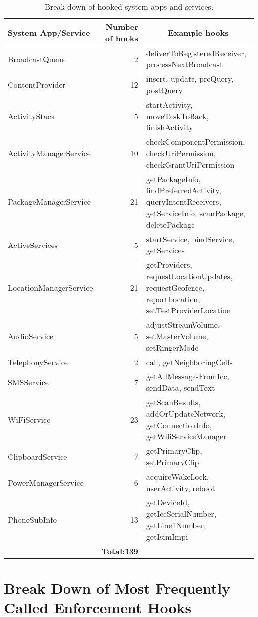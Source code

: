 \documentclass[letterpaper,twocolumn,10pt]{article}
\begin{document}
\begin{table}[h]
  \centering
  \small
  \begin{tabular}{|l|r|p{8cm}|}\hline
    \textbf{System App/Service} & \textbf{Number of hooks} & \multicolumn{1}{|c|}{\textbf{Example hooks}}\\\hline\hline
    BroadcastQueue & 2 & deliverToRegisteredReceiver, processNextBroadcast \\\hline
    ContentProvider & 12 & insert, update, preQuery, postQuery \\\hline
    ActivityStack & 5 & startActivity, moveTaskToBack, finishActivity \\\hline
    ActivityManagerService & 10 & checkComponentPermission, checkUriPermission, checkGrantUriPermission\\\hline
    PackageManagerService & 21 & getPackageInfo, findPreferredActivity, queryIntentReceivers, getServiceInfo, scanPackage, deletePackage\\\hline
ActiveServices & 5 & startService, bindService, getServices\\\hline
LocationManagerService & 21 & getProviders, requestLocationUpdates, requestGeofence, reportLocation, setTestProviderLocation\\\hline
AudioService & 5 & adjustStreamVolume, setMasterVolume, setRingerMode\\\hline
TelephonyService & 2 & call, getNeighboringCells\\\hline
SMSService & 7 & getAllMessagesFromIcc, sendData, sendText\\\hline
WiFiService & 23 & getScanResults, addOrUpdateNetwork, getConnectionInfo, getWifiServiceManager\\\hline
ClipboardService & 7 & getPrimaryClip, setPrimaryClip\\\hline
PowerManagerService & 6 & acquireWakeLock, userActivity, reboot\\\hline
PhoneSubInfo & 13 & getDeviceId, getIccSerialNumber, getLine1Number, getIsimImpi\\\hline
\multicolumn{1}{c|}{} & \multicolumn{1}{r|}{\textbf{Total:\hfill139}} & \multicolumn{1}{c}{} \\\cline{2-2}
  \end{tabular}
  \caption{Break down of hooked system apps and services.}
  \label{tab:coveragebreakdown}
\end{table}

\section{Break Down of Most Frequently Called Enforcement Hooks}
\label{sec:appendix:hookfreq}
\end{document}
